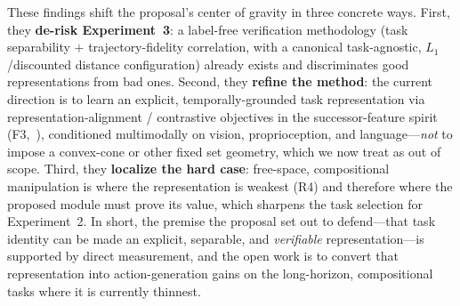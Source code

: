 These findings shift the proposal's center of gravity in three concrete ways.
First, they \textbf{de-risk Experiment~3}: a label-free verification methodology
(task separability $+$ trajectory-fidelity correlation, with a canonical
task-agnostic, $L_1$/discounted distance configuration) already exists and
discriminates good representations from bad ones. Second, they \textbf{refine the
method}: the current direction is to learn an explicit, temporally-grounded task
representation via representation-alignment / contrastive objectives in the
successor-feature spirit (F3,~\cite{tra,infom}), conditioned multimodally on
vision, proprioception, and language---\emph{not} to impose a convex-cone or
other fixed set geometry, which we now treat as out of scope. Third, they
\textbf{localize the hard case}: free-space, compositional manipulation is where
the representation is weakest (R4) and therefore where the proposed module must
prove its value, which sharpens the task selection for Experiment~2. In short,
the premise the proposal set out to defend---that task identity can be made an
explicit, separable, and \emph{verifiable} representation---is supported by
direct measurement, and the open work is to convert that representation into
action-generation gains on the long-horizon, compositional tasks where it is
currently thinnest.

%
